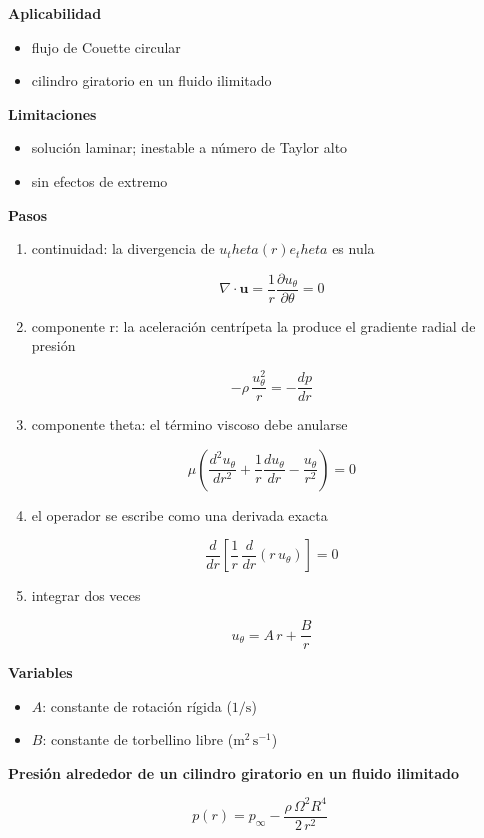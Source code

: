 \documentclass[10pt,openany]{book}
\begin{document}
\begin{tcolorbox}[title={Desarrollos del modelo}, studiumdef, breakable]
\noindent\textbf{Aplicabilidad}
\begin{itemize}
\item flujo de Couette circular
\item cilindro giratorio en un fluido ilimitado
\end{itemize}

\noindent\textbf{Limitaciones}
\begin{itemize}
\item solución laminar; inestable a número de Taylor alto
\item sin efectos de extremo
\end{itemize}

\noindent\textbf{Pasos}
\begin{enumerate}
\item
continuidad: la divergencia de \(u_theta(r) e_theta\) es nula

\[
\nabla\cdot\mathbf{u} = \frac{1}{r}\frac{\partial u_\theta}{\partial\theta} = 0
\]
\item
componente r: la aceleración centrípeta la produce el gradiente radial de presión

\[
-\rho\,\frac{u_\theta^{2}}{r} = -\frac{dp}{dr}
\]
\item
componente theta: el término viscoso debe anularse

\[
\mu\left(\frac{d^{2}u_\theta}{dr^{2}} + \frac{1}{r}\frac{du_\theta}{dr} - \frac{u_\theta}{r^{2}}\right) = 0
\]
\item
el operador se escribe como una derivada exacta

\[
\frac{d}{dr}\!\left[\frac{1}{r}\,\frac{d}{dr}\left(r\,u_\theta\right)\right] = 0
\]
\item
integrar dos veces

\[
u_\theta = A\,r + \frac{B}{r}
\]
\end{enumerate}

\noindent\textbf{Variables}
\begin{itemize}
\item $A$: constante de rotación rígida ($\mathrm{1/s}$)
\item $B$: constante de torbellino libre ($\mathrm{m}^{2}\,\mathrm{s}^{-1}$)
\end{itemize}



\noindent\textbf{Presión alrededor de un cilindro giratorio en un fluido ilimitado}

\begin{equation}
p(r) = p_\infty - \frac{\rho\,\Omega^{2}R^{4}}{2\,r^{2}}
\label{eq:c14-presion-vortice}
\end{equation}


\end{tcolorbox}
\end{document}
